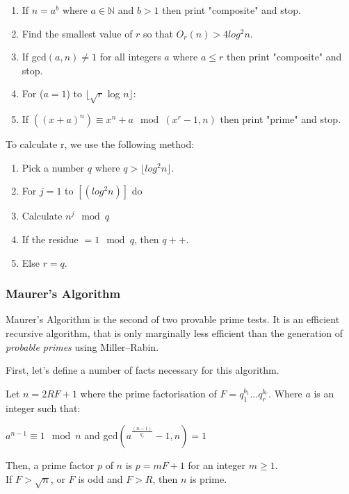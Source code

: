     \begin{enumerate}
      \item If $n = a^b$ where $a \in \mathbb{N}$ and $b > 1$ then print "composite" and stop.
      \item Find the smallest value of $r$ so that $O_r(n) > 4log^2n$.
      \item If gcd$(a,n) \neq 1$ for all integers $a$ where $a \leq r$ then print "composite" and stop.
      \item For ($a=1$) to $\lfloor \sqrt{r} $ log $ n \rfloor$:
      \item If $((x+a)^n) \equiv x^n + a \mod{(x^r-1, n)}$ then print "prime" and stop.
    \end{enumerate}
    
    To calculate r, we use the following method:
    
    \begin{enumerate}
      \item Pick a number $q$ where $q > \lfloor log^2n \rfloor$.
      \item For $j=1$ to $[(log^2n)]$ do
      \item   Calculate $n^j \mod{q}$
      \item   If the residue $= 1 \mod{q}$, then $q++$.
      \item   Else $r=q$.
    \end{enumerate}
    
    \subsubsection{Maurer's Algorithm}
    
    Maurer's Algorithm is the second of two provable prime tests. It is an efficient recursive algorithm, that is only marginally less efficient than the generation of \emph{probable primes} using Miller--Rabin.
    
    First, let's define a number of facts necessary for this algorithm\cite{Maurer:1994aa}.
    
    \begin{mathdef}
      Let $n=2RF+1$ where the prime factorisation of $F=q_1^{b_1}...q_r^{b_r}$. Where $a$ is an integer such that: 
      \begin{center}
        $a^{n-1} \equiv 1 \mod n$ and gcd$(a^{\frac{(n-1)}{q_r}}-1,n) = 1$
      \end{center}
      Then, a prime factor $p$ of $n$ is $p = mF+1$ for an integer $m \geq 1$. \\
      If $F > \sqrt{n}$, or $F$ is odd and $F > R$, then $n$ is prime.
    \end{mathdef}
    
